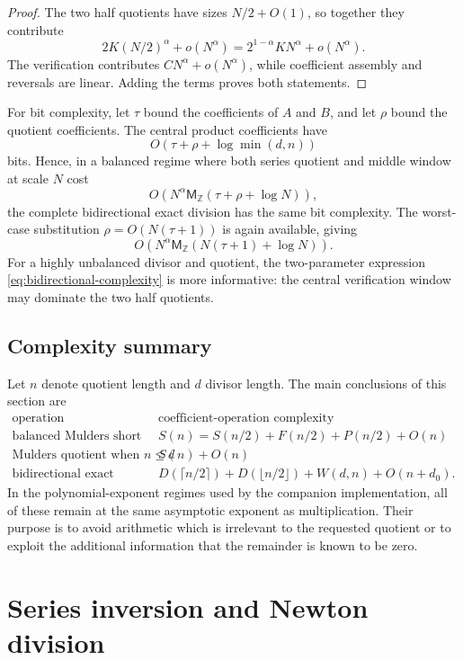 \documentclass[11pt]{book}
\theoremstyle{definition}
\newcommand{\ZZ}{\mathbb Z}
\newcommand{\MZ}{\mathsf M_{\ZZ}}
\begin{document}
\begin{proof}
The two half quotients have sizes $N/2+O(1)$, so together they contribute
\[
 2K(N/2)^\alpha+o(N^\alpha)
 =2^{1-\alpha}KN^\alpha+o(N^\alpha).
\]
The verification contributes $CN^\alpha+o(N^\alpha)$, while coefficient
assembly and reversals are linear.  Adding the terms proves both statements.
\end{proof}

For bit complexity, let $\tau$ bound the coefficients of $A$ and $B$, and let
$\rho$ bound the quotient coefficients.  The central product coefficients
have
\[
 O(\tau+\rho+\log\min(d,n))
\]
bits.  Hence, in a balanced regime where both series quotient and middle
window at scale $N$ cost
\[
 O\!\left(N^\alpha\MZ(\tau+\rho+\log N)\right),
\]
the complete bidirectional exact division has the same bit complexity.  The
worst-case substitution $\rho=O(N(\tau+1))$ is again available, giving
\[
 O\!\left(N^\alpha\MZ(N(\tau+1)+\log N)\right).
\]
For a highly unbalanced divisor and quotient, the two-parameter expression
\eqref{eq:bidirectional-complexity} is more informative: the central
verification window may dominate the two half quotients.

\subsection{Complexity summary}

Let $n$ denote quotient length and $d$ divisor length.  The main conclusions of
this section are
\[
\begin{array}{c|c}
\text{operation} & \text{coefficient-operation complexity}\\
\hline
\text{balanced Mulders short quotient} &
 S(n)=S(n/2)+F(n/2)+P(n/2)+O(n)\\
\text{Mulders quotient when }n\leq d & S(n)+O(n)\\
\text{bidirectional exact quotient} &
 D(\lceil n/2\rceil)+D(\lfloor n/2\rfloor)+W(d,n)+O(n+d_0).
\end{array}
\]
In the polynomial-exponent regimes used by the companion implementation, all
of these remain at the same asymptotic exponent as multiplication.  Their
purpose is to avoid arithmetic which is irrelevant to the requested quotient
or to exploit the additional information that the remainder is known to be
zero.



\section{Series inversion and Newton division}\label{sec:newton-division}
\end{document}
